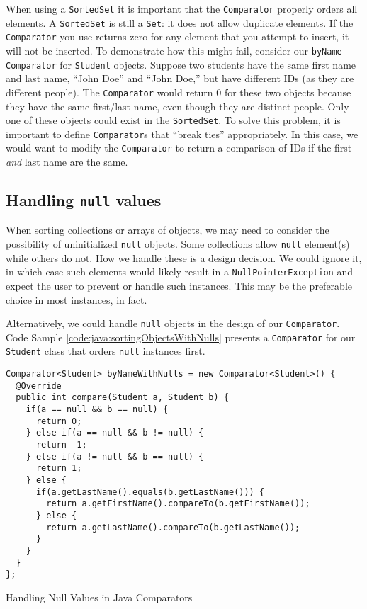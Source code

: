 When using a \texttt{SortedSet} it is important that the 
\texttt{Comparator} properly orders all elements.  A 
\texttt{SortedSet} is still a \texttt{Set}: it
does not allow duplicate elements.  If the \texttt{Comparator} 
you use returns zero for any element that you attempt to insert, it
will not be inserted.  To demonstrate how this might fail, consider
our \texttt{byName} \texttt{Comparator} for 
\texttt{Student} objects.  Suppose two students have
the same first name and last name, ``John Doe'' and ``John Doe,'' but
have different IDs (as they are different people).
The \texttt{Comparator} would return 0 for these
two objects because they have the same first/last name, even though
they are distinct people.  Only one of these objects could 
exist in the \texttt{SortedSet}.
To solve this problem, it is important to define \texttt{Comparator}s
that ``break ties'' appropriately.  In this case, we would want to 
modify the \texttt{Comparator} to return a comparison
of IDs if the first \emph{and} last name are the same.  

\subsection{Handling \texttt{null} values}
\label{subsection:sortingObjectsWithNulls}

When sorting collections or arrays of objects, we may need to consider 
the possibility of uninitialized \texttt{null} objects.  Some
collections allow \texttt{null} element(s) while others do not.
How we handle these is a design decision.  We could ignore it, in which 
case such elements would likely result in a \texttt{NullPointerException} 
and expect the user to prevent or handle such instances.  This may be 
the preferable choice in most instances, in fact.

Alternatively, we could handle \texttt{null} objects in the 
design of our \texttt{Comparator}.  Code Sample 
\ref{code:java:sortingObjectsWithNulls} presents a \texttt{Comparator} 
for our \texttt{Student} class that orders \texttt{null}
instances first.

\begin{listing}[H]
\begin{verbatim}
Comparator<Student> byNameWithNulls = new Comparator<Student>() {
  @Override
  public int compare(Student a, Student b) {
    if(a == null && b == null) {
      return 0;
    } else if(a == null && b != null) {
      return -1;
    } else if(a != null && b == null) {
      return 1;
    } else {
      if(a.getLastName().equals(b.getLastName())) {
        return a.getFirstName().compareTo(b.getFirstName());
      } else {
        return a.getLastName().compareTo(b.getLastName());
      }
    }
  }
};
\end{verbatim}
\caption{Handling Null Values in Java Comparators}
\label{code:java:sortingObjectsWithNulls}
\end{listing}

